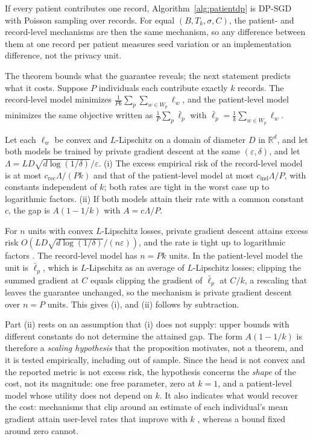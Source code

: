 \begin{corollary}
\label{cor:k1}
If every patient contributes one record, Algorithm~\ref{alg:patientdp} is
DP-SGD with Poisson sampling over records. For equal $(B, T_k, \sigma, C)$,
the patient- and record-level mechanisms are then the same mechanism, so any
difference between them at one record per patient measures seed variation or
an implementation difference, not the privacy unit.
\end{corollary}

The theorem bounds what the guarantee reveals; the next statement predicts
what it costs. Suppose $P$ individuals each contribute exactly $k$ records.
The record-level model minimizes $\frac{1}{Pk}\sum_p\sum_{w\in W_p}\ell_w$, and
the patient-level model minimizes the same objective written as
$\frac{1}{P}\sum_p \bar\ell_p$ with $\bar\ell_p = \frac{1}{k}\sum_{w\in
W_p}\ell_w$.

\begin{proposition}
\label{prop:scaling}
Let each $\ell_w$ be convex and $L$-Lipschitz on a domain of diameter $D$ in
$\mathbb{R}^d$, and let both models be trained by private gradient descent at
the same $(\varepsilon,\delta)$, and let $\Lambda =
LD\sqrt{d\log(1/\delta)}/\varepsilon$. (i) The excess empirical risk of the
record-level model is at most $c_{\mathrm{rec}}\Lambda/(Pk)$ and that of the
patient-level model at most $c_{\mathrm{ind}}\Lambda/P$, with constants
independent of $k$; both rates are tight in the worst case up to logarithmic factors. (ii) If both models
attain their rate with a common constant $c$, the gap is $A(1 - 1/k)$ with
$A = c\Lambda/P$.
\end{proposition}

\begin{IEEEproof}
For $n$ units with convex $L$-Lipschitz losses, private gradient descent
attains excess risk $O(LD\sqrt{d\log(1/\delta)}/(n\varepsilon))$, and the rate
is tight up to logarithmic factors \cite{ref31}. The record-level model has $n = Pk$ units. In the
patient-level model the unit is $\bar\ell_p$, which is $L$-Lipschitz as an
average of $L$-Lipschitz losses; clipping the summed gradient at $C$ equals
clipping the gradient of $\bar\ell_p$ at $C/k$, a rescaling that leaves the
guarantee unchanged, so the mechanism is private gradient descent over $n = P$
units. This gives (i), and (ii) follows by subtraction.
\end{IEEEproof}

Part (ii) rests on an assumption that (i) does not supply: upper bounds with
different constants do not determine the attained gap. The form
$A(1-1/k)$ is therefore a \emph{scaling hypothesis} that the proposition
motivates, not a theorem, and it is tested empirically, including out of
sample. Since the head is not convex and the reported metric is not excess
risk, the hypothesis concerns the \emph{shape} of the cost, not its
magnitude: one free parameter, zero at $k = 1$, and a patient-level model whose
utility does not depend on $k$. It also indicates what would recover
the cost: mechanisms that clip around an estimate of each individual's mean
gradient attain user-level rates that improve with $k$ \cite{ref32}, whereas
a bound fixed around zero cannot.

